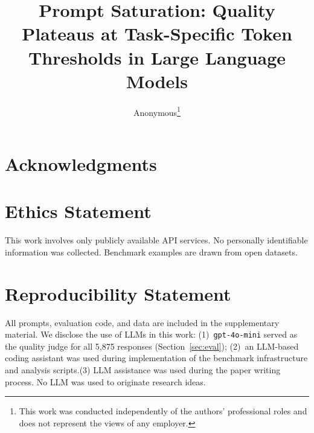\documentclass{article}
\title{Prompt Saturation: Quality Plateaus at Task-Specific Token Thresholds
       in Large Language Models}
\author{Anonymous\thanks{This work was conducted independently of the authors'
professional roles and does not represent the views of any employer.}}
\begin{document}
\ifcolmsubmission
\linenumbers
\fi

\maketitle









\section*{Acknowledgments}

\section*{Ethics Statement}
This work involves only publicly available API services.
No personally identifiable information was collected.
Benchmark examples are drawn from open datasets.

\section*{Reproducibility Statement}
All prompts, evaluation code, and data are included in the supplementary material.
We disclose the use of LLMs in this work:
(1)~\texttt{gpt-4o-mini} served as the quality judge for all 5,875 responses
(Section~\ref{sec:eval});
(2)~an LLM-based coding assistant was used during implementation of the
benchmark infrastructure and analysis scripts.(3) LLM assistance was used during the paper writing process. 
No LLM was used to originate research ideas.




\appendix

\end{document}
